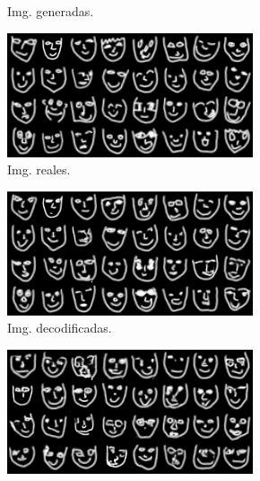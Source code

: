 \begin{figure}[H]
\begin{subfigure}[b]{0.32\textwidth}
        \caption{Img. generadas.}
        \label{fig:gen1}
    \end{subfigure}
    \begin{subfigure}[b]{0.32\textwidth}
        \centering
        \includegraphics[width=\textwidth]{img/wgan-wae/real2.png}
        \caption{Img. reales.}
        \label{fig:real2}
    \end{subfigure}
    \hfill
    \begin{subfigure}[b]{0.32\textwidth}
        \centering
        \includegraphics[width=\textwidth]{img/wgan-wae/decoded2.png}
        \caption{Img. decodificadas.}
        \label{fig:decoded2}
    \end{subfigure}
    \hfill
    \begin{subfigure}[b]{0.32\textwidth}
        \centering
        \includegraphics[width=\textwidth]{img/wgan-wae/gen2.png}

\end{subfigure}
\end{figure}
